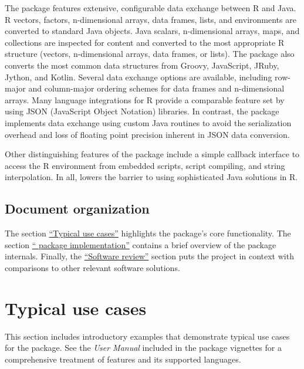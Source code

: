 The  package features extensive, configurable data exchange between R and Java. R vectors, factors, n-dimensional arrays, data frames, lists, and environments are converted to standard Java objects. Java scalars, n-dimensional arrays, maps, and collections are inspected for content and converted to the most appropriate R structure (vectors, n-dimensional arrays, data frames, or lists). The  package also converts the most common data structures from Groovy, JavaScript, JRuby, Jython, and Kotlin. Several data exchange options are available, including row-major and column-major ordering schemes for data frames and n-dimensional arrays. Many language integrations for R provide a comparable feature set by using JSON (JavaScript Object Notation) libraries. In contrast, the  package implements data exchange using custom Java routines to avoid the serialization overhead and loss of floating point precision inherent in JSON data conversion.

Other distinguishing features of the  package include a simple callback interface to access the R environment from embedded scripts, script compiling, and string interpolation. In all,  lowers the barrier to using sophisticated Java solutions in R.

\subsection{Document organization}

The section \hyperlink{typical-use-cases}{``Typical use cases''} highlights the  package's core functionality. The section \hyperlink{the-jsr223-package-implementation}{`` package implementation''} contains a brief overview of the package internals. Finally, the  \hyperlink{software-review}{``Software review''} section puts the  project in context with comparisons to other relevant software solutions.

\hypertarget{typical-use-cases}{}
\section{Typical use cases}

This section includes introductory examples that demonstrate typical use cases for the  package. See the \textit{ User Manual} included in the package vignettes for a comprehensive treatment of  features and its supported languages.

